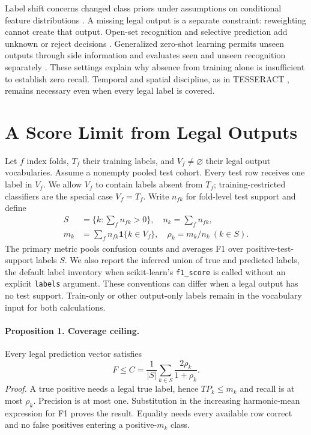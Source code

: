 \documentclass[namedate,webpdf,contemporary,large]{TBench-template}
\begin{document}
Label shift concerns changed class priors under assumptions on conditional feature distributions \cite{lipton2018}. A missing legal output is a separate constraint: reweighting cannot create that output. Open-set recognition and selective prediction add unknown or reject decisions \cite{scheirer2013,geng2021,chow1970,geifman2019}. Generalized zero-shot learning permits unseen outputs through side information and evaluates seen and unseen recognition separately \cite{xian2017}. These settings explain why absence from training alone is insufficient to establish zero recall. Temporal and spatial discipline, as in TESSERACT \cite{pendlebury2019}, remains necessary even when every legal label is covered.

\section{A Score Limit from Legal Outputs}
Let \(f\) index folds, \(T_f\) their training labels, and \(V_f\ne\varnothing\) their legal output vocabularies. Assume a nonempty pooled test cohort. Every test row receives one label in \(V_f\). We allow \(V_f\) to contain labels absent from \(T_f\); training-restricted classifiers are the special case \(V_f=T_f\). Write \(n_{fk}\) for fold-level test support and define
\[
\begin{aligned}
S&=\{k:\textstyle\sum_f n_{fk}>0\},\quad n_k=\sum_f n_{fk},\\
m_k&=\sum_fn_{fk}\mathbf{1}\{k\in V_f\},\quad \rho_k=m_k/n_k\ (k\in S).
\end{aligned}
\]
The primary metric pools confusion counts and averages F1 over positive-test-support labels \(S\). We also report the inferred union of true and predicted labels, the default label inventory when scikit-learn's \texttt{f1\_score} is called without an explicit \texttt{labels} argument. These conventions can differ when a legal output has no test support. Train-only or other output-only labels remain in the vocabulary input for both calculations.

\paragraph{Proposition 1. Coverage ceiling.}
Every legal prediction vector satisfies
\[
F\le C=\frac{1}{|S|}\sum_{k\in S}\frac{2\rho_k}{1+\rho_k}.
\]
\emph{Proof.} A true positive needs a legal true label, hence \(TP_k\le m_k\) and recall is at most \(\rho_k\). Precision is at most one. Substitution in the increasing harmonic-mean expression for F1 proves the result. Equality needs every available row correct and no false positives entering a positive-\(m_k\) class.
\end{document}
